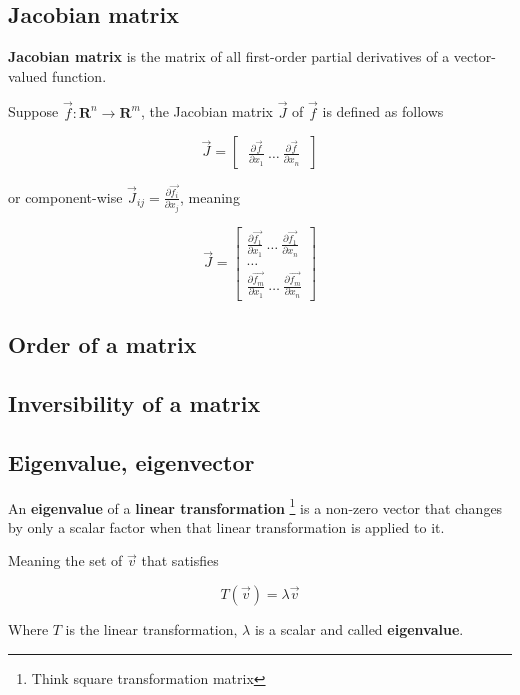 \documentclass{article}
\begin{document}
\subsection{Jacobian matrix}

\textbf{Jacobian matrix} is the matrix of all first-order partial derivatives of a vector-valued function.

Suppose $\vec{f} : \mathbf{R}^n \to \mathbf{R}^m$, the Jacobian matrix $\vec{J}$ of $\vec{f}$ is defined as follows

$$
\vec{J} = \begin{bmatrix} ~ \frac{\partial \vec{f}}{\partial x_1} ~ \dots ~ \frac{\partial \vec{f}}{\partial x_n} ~ \end{bmatrix}
$$

or component-wise $\vec{J}_{ij} = \frac{\partial \vec{f_i}}{\partial x_j}$, meaning

$$
\vec{J} = 
 \begin{bmatrix}
  \frac{\partial \vec{f_1}}{\partial x_1} ~ \dots ~ \frac{\partial \vec{f_1}}{\partial x_n} \\
  \dots \\
  \frac{\partial \vec{f_m}}{\partial x_1} ~ \dots ~ \frac{\partial \vec{f_m}}{\partial x_n}
 \end{bmatrix}
$$

\subsection{Order of a matrix}



\subsection{Inversibility of a matrix}



\subsection{Eigenvalue, eigenvector}

An \textbf{eigenvalue} of a \textbf{linear transformation} \footnote{Think square transformation matrix} is a non-zero vector that changes by only a scalar factor when that linear transformation is applied to it.

Meaning the set of $\vec{v}$ that satisfies

$$
T(\vec{v}) = \lambda \vec{v}
$$

Where $T$ is the linear transformation, $\lambda$ is a scalar and called \textbf{eigenvalue}.
\end{document}
